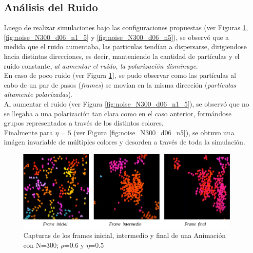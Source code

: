 \documentclass[12pt, a4paper]{report}
\begin{document}

\subsection{Análisis del Ruido}

Luego de realizar simulaciones bajo las configuraciones propuestas (ver Figuras \ref{fig:noise_N300_d06_n05}, \ref{fig:noise_N300_d06_n1_5} y \ref{fig:noise_N300_d06_n5}), se observó que a medida que el ruido aumentaba, las particulas tendían a dispersarse, dirigiendose hacia distintas direcciones, es decir, manteniendo la cantidad de partículas y el ruido constante, \emph{al aumentar el ruido, la polarización disminuye}.\\

En caso de poco ruido (ver Figura \ref{fig:noise_N300_d06_n05}), se pudo observar como las partículas al cabo de un par de pasos (\emph{frames}) se movían en la misma dirección (\emph{partículas altamente polarizadas}).\\

Al aumentar el ruido (ver Figura \ref{fig:noise_N300_d06_n1_5}), se observó que no se llegaba a una polarización tan clara como en el caso anterior, formándose grupos representados a través de los distintos colores.\\

Finalmente para $\eta = 5$ (ver Figura \ref{fig:noise_N300_d06_n5}), se obtuvo una imágen invariable de múltiples colores y desorden a través de toda la simulación.

\begin{figure}[h]
\includegraphics[scale=0.4]{noise_N300_d06_n05.png}
\centering 
\caption{Capturas de los frames inicial, intermedio y final de una Animación con N=300; $\rho$=0.6 y $\eta$=0.5}
\label{fig:noise_N300_d06_n05}
\end{figure}
\end{document}
